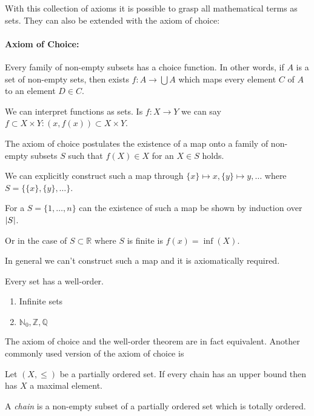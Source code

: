 With this collection of axioms it is possible to grasp all mathematical terms as sets.
They can also be extended with the axiom of choice:

\paragraph{Axiom of Choice:} Every family of non-empty subsets has a choice function.
In other words, if \(A\) is a set of non-empty sets, then exists \(f: A \to \bigcup A\) which maps every element \(C\) of \(A\) to an element \(D \in C\).
\begin{example}
   We can interpret functions as sets.
   Is \(f: X \to Y\) we can say \(f \subset X \times Y: (x, f(x)) \subset X \times Y\).
\end{example}
\begin{example}
   The axiom of choice postulates the existence of a map onto a family of non-empty subsets \(S\) such that \(f(X) \in X\) for an \(X \in S\) holds.

   We can explicitly construct such a map through \(\{x\} \mapsto x, \{y\} \mapsto y, \ldots\) where \(S = \{\{x\}, \{y\}, \ldots\}\).

   For a \(S = \{1, \ldots, n\}\) can the existence of such a map be shown by induction over \(\left\lvert S\right\rvert\).

   Or in the case of \(S \subset \mathbb{R}\) where \(S\) is finite is \(f(x) = \inf(X)\).

   In general we can't construct such a map and it is axiomatically required.
\end{example}

\begin{theorem}
   Every set has a well-order.
\end{theorem}
\begin{example}
   \begin{enumerate}
      \item Infinite sets
      \item \(\mathbb{N}_0, \mathbb{Z}, \mathbb{Q}\)
   \end{enumerate}
\end{example}

The axiom of choice and the well-order theorem are in fact equivalent.
Another commonly used version of the axiom of choice is
\begin{theorem}
   Let \((X, \leq)\) be a partially ordered set.
   If every chain has an upper bound then has \(X\) a maximal element.
\end{theorem}
\begin{remark}
   A \emph{chain} is a non-empty subset of a partially ordered set which is totally ordered.
\end{remark}

